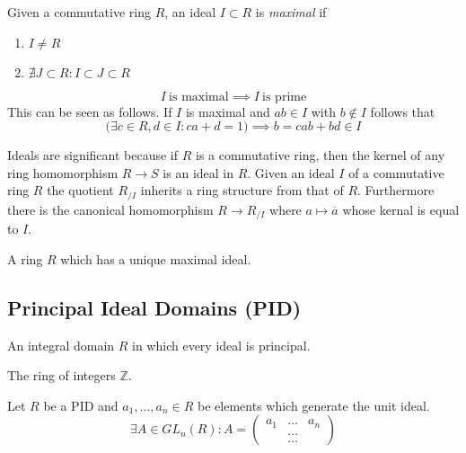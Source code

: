 \begin{definition}\label{def:max_ideal}
   Given a commutative ring \(R\), an ideal \(I \subset R\) is \emph{maximal} if
   \begin{enumerate}[label=\roman*, align=Center]
      \item \(I \neq R\)
      \item \(\nexists J \subset R: I \subset J \subset R\)
   \end{enumerate}
\end{definition}
\begin{remark}
   \[I~\text{is maximal} \implies I~\text{is prime}\]
   This can be seen as follows.
   If \(I\) is maximal and \(ab \in I\) with \(b \notin I\) follows that
   \[\big(\exists c \in R, d \in I: ca + d = 1\big) \implies b = cab + bd \in I\]
\end{remark}
Ideals are significant because if \(R\) is a commutative ring, then the kernel of any ring homomorphism \(R \to S\) is an ideal in \(R\).
Given an ideal \(I\) of a commutative ring \(R\) the quotient \(R_{/I}\) inherits a ring structure from that of \(R\).
Furthermore there is the canonical homomorphism \(R \to R_{/I}\) where \(a \mapsto \overline{a}\) whose kernal is equal to \(I\).
\begin{definition}
   A ring \(R\) which has a unique maximal ideal.
\end{definition}

\subsection{Principal Ideal Domains (PID)}
\begin{definition}
   An integral domain \(R\) in which every ideal is principal.
\end{definition}
\begin{example}
   The ring of integers \(\mathbb{Z}\).
\end{example}

\begin{lemma}
   Let \(R\) be a PID and \(a_1, \ldots, a_n \in R\) be elements which generate the unit ideal.
   \[\exists A \in GL_n(R): A = \begin{pmatrix}a_1 & \ldots & a_n\\ & \ldots & \\ & \ldots & \end{pmatrix}\]
\end{lemma}


